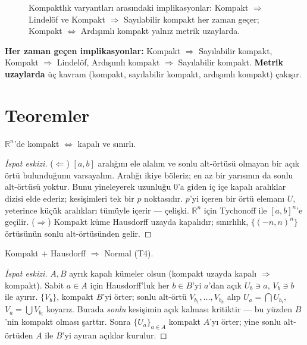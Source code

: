 \begin{figure}[ht]
  \centering
  
  \caption{Kompaktlık varyantları arasındaki implikasyonlar: Kompakt
    $\Rightarrow$ Lindelöf ve Kompakt $\Rightarrow$ Sayılabilir kompakt her zaman
    geçer; Kompakt $\Leftrightarrow$ Ardışımlı kompakt yalnız metrik uzaylarda.}
\end{figure}

\textbf{Her zaman geçen implikasyonlar:} Kompakt $\Rightarrow$ Sayılabilir
kompakt, Kompakt $\Rightarrow$ Lindelöf, Ardışımlı kompakt $\Rightarrow$
Sayılabilir kompakt. \textbf{Metrik uzaylarda} üç kavram (kompakt, sayılabilir
kompakt, ardışımlı kompakt) çakışır.

\section{Teoremler}

\begin{theorem}
$\mathbb{R}^n$'de kompakt $\Leftrightarrow$ kapalı ve sınırlı.
\end{theorem}

\begin{proof}[İspat eskizi]
($\Leftarrow$) $[a,b]$ aralığını ele alalım ve sonlu alt-örtüsü olmayan bir açık
örtü bulunduğunu varsayalım. Aralığı ikiye böleriz; en az bir yarısının da sonlu
alt-örtüsü yoktur. Bunu yineleyerek uzunluğu $0$'a giden iç içe kapalı aralıklar
dizisi elde ederiz; kesişimleri tek bir $p$ noktasıdır. $p$'yi içeren bir örtü
elemanı $U$, yeterince küçük aralıkları tümüyle içerir --- çelişki. $\mathbb{R}^n$
için Tychonoff ile $[a,b]^n$'e geçilir. ($\Rightarrow$) Kompakt küme Hausdorff
uzayda kapalıdır; sınırlılık, $\{(-n,n)^n\}$ örtüsünün sonlu alt-örtüsünden gelir.
\end{proof}

\begin{theorem}
Kompakt $+$ Hausdorff $\Rightarrow$ Normal (T4).
\end{theorem}

\begin{proof}[İspat eskizi]
$A, B$ ayrık kapalı kümeler olsun (kompakt uzayda kapalı $\Rightarrow$ kompakt).
Sabit $a\in A$ için Hausdorff'luk her $b\in B$'yi $a$'dan açık $U_b \ni a$,
$V_b \ni b$ ile ayırır. $\{V_b\}$, kompakt $B$'yi örter; sonlu alt-örtü
$V_{b_1},\dots,V_{b_k}$ alıp $U_a=\bigcap U_{b_i}$, $V_a=\bigcup V_{b_i}$ koyarız.
Burada \emph{sonlu} kesişimin açık kalması kritiktir --- bu yüzden $B$'nin kompakt
olması şarttır. Sonra $\{U_a\}_{a\in A}$ kompakt $A$'yı örter; yine sonlu
alt-örtüden $A$ ile $B$'yi ayıran açıklar kurulur.
\end{proof}

